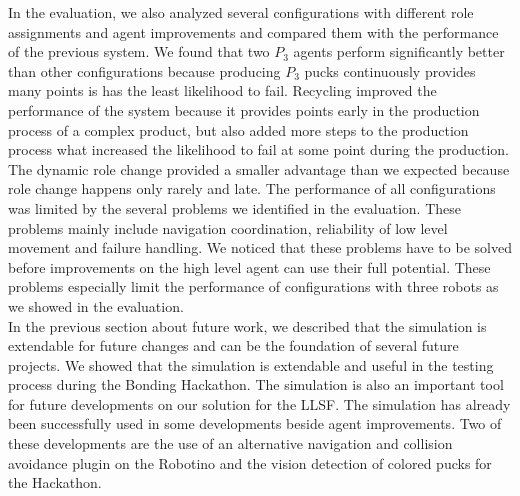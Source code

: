 In the evaluation, we also analyzed several configurations with different role assignments and agent improvements and compared them with the performance of the previous system. We found that two $P_3$ agents perform significantly better than other configurations because producing $P_3$ pucks continuously provides many points is has the least likelihood to fail. Recycling improved the performance of the system because it provides points early in the production process of a complex product, but also added more steps to the production process what increased the likelihood to fail at some point during the production. The dynamic role change provided a smaller advantage than we expected because role change happens only rarely and late. The performance of all configurations was limited by the several problems we identified in the evaluation. These problems mainly include navigation coordination, reliability of low level movement and failure handling. We noticed that these problems have to be solved before improvements on the high level agent can use their full potential. These problems especially limit the performance of configurations with three robots as we showed in the evaluation.\\
In the previous section about future work, we described that the simulation is extendable for future changes and can be the foundation of several future projects. We showed that the simulation is extendable and useful in the testing process during the Bonding Hackathon. The simulation is also an important tool for future developments on our solution for the LLSF. The simulation has already been successfully used in some developments beside agent improvements. Two of these developments are the use of an alternative navigation and collision avoidance plugin on the Robotino and the vision detection of colored pucks for the Hackathon.
